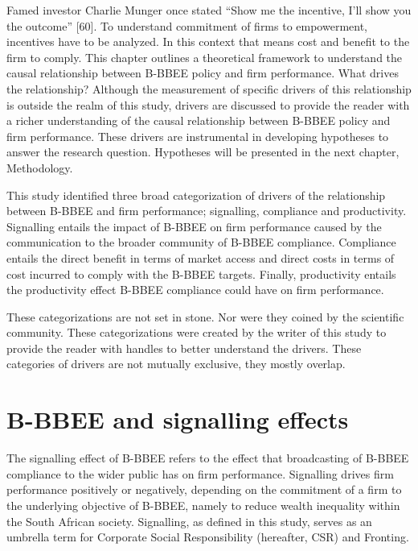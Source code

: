 Famed investor Charlie Munger once stated “Show me the incentive, I’ll show you the outcome” [60]. To understand commitment of firms to empowerment, incentives have to be analyzed. In this context that means cost and benefit to the firm to comply. This chapter outlines a theoretical framework to understand the causal relationship between B-BBEE policy and firm performance. What drives the relationship? Although the measurement of specific drivers of this relationship is outside the realm of this study, drivers are discussed to provide the reader with a richer understanding of the causal relationship between B-BBEE policy and firm performance. These drivers are instrumental in developing hypotheses to answer the research question. Hypotheses will be presented in the next chapter, Methodology.

This study identified three broad categorization of drivers of the relationship between B-BBEE and firm performance; signalling, compliance and productivity. Signalling entails the impact of B-BBEE on firm performance caused by the communication to the broader community of B-BBEE compliance. Compliance entails the direct benefit in terms of market access and direct costs in terms of cost incurred to comply with the B-BBEE targets. Finally, productivity entails the productivity effect B-BBEE compliance could have on firm performance.

These categorizations are not set in stone. Nor were they coined by the scientific community. These categorizations were created by the writer of this study to provide the reader with handles to better understand the drivers. These categories of drivers are not mutually exclusive, they mostly overlap. 
\section{B-BBEE and signalling effects}
The signalling effect of B-BBEE refers to the effect that broadcasting of B-BBEE compliance to the wider public has on firm performance. Signalling drives firm performance positively or negatively, depending on the commitment of a firm to the underlying objective of B-BBEE, namely to reduce wealth inequality within the South African society. Signalling, as defined in this study,  serves as an umbrella term for Corporate Social Responsibility (hereafter, CSR) and Fronting.
